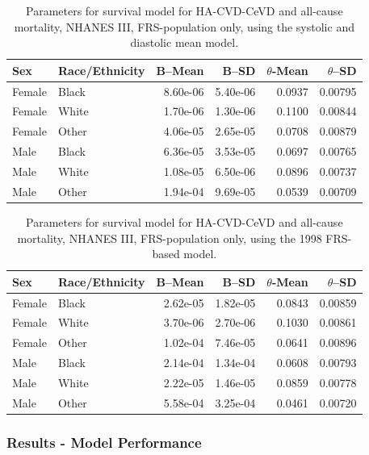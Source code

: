\documentclass[
]{article}
\begin{document}
\begin{table}

\caption{\label{tab:RL34}Parameters for survival model for HA-CVD-CeVD and all-cause mortality, NHANES III, FRS-population only, using the systolic and diastolic mean model.}
\centering
\begin{tabular}[t]{llrrrr}
\toprule
Sex & Race/Ethnicity & B–Mean & B–SD & $\theta$-Mean & $\theta$–SD\\
\midrule
Female & Black & 8.60e-06 & 5.40e-06 & 0.0937 & 0.00795\\
Female & White & 1.70e-06 & 1.30e-06 & 0.1100 & 0.00844\\
Female & Other & 4.06e-05 & 2.65e-05 & 0.0708 & 0.00879\\
Male & Black & 6.36e-05 & 3.53e-05 & 0.0697 & 0.00765\\
Male & White & 1.08e-05 & 6.50e-06 & 0.0896 & 0.00737\\
\addlinespace
Male & Other & 1.94e-04 & 9.69e-05 & 0.0539 & 0.00709\\
\bottomrule
\end{tabular}
\end{table}

\begin{table}

\caption{\label{tab:RL78}Parameters for survival model for HA-CVD-CeVD and all-cause mortality, NHANES III, FRS-population only, using the 1998 FRS-based model.}
\centering
\begin{tabular}[t]{llrrrr}
\toprule
Sex & Race/Ethnicity & B–Mean & B–SD & $\theta$-Mean & $\theta$–SD\\
\midrule
Female & Black & 2.62e-05 & 1.82e-05 & 0.0843 & 0.00859\\
Female & White & 3.70e-06 & 2.70e-06 & 0.1030 & 0.00861\\
Female & Other & 1.02e-04 & 7.46e-05 & 0.0641 & 0.00896\\
Male & Black & 2.14e-04 & 1.34e-04 & 0.0608 & 0.00793\\
Male & White & 2.22e-05 & 1.46e-05 & 0.0859 & 0.00778\\
\addlinespace
Male & Other & 5.58e-04 & 3.25e-04 & 0.0461 & 0.00720\\
\bottomrule
\end{tabular}
\end{table}

\hypertarget{results---model-performance}{%
\subsubsection{Results - Model Performance}\label{results---model-performance}}
\end{document}
